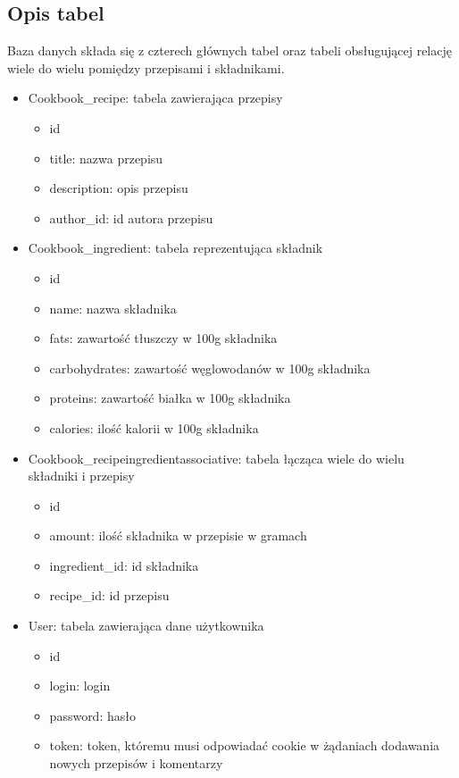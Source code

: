 \documentclass[11pt]{article}
\begin{document}
\subsection{Opis tabel}
Baza danych składa się z czterech głównych tabel oraz tabeli obsługującej relację
wiele do wielu pomiędzy przepisami i składnikami.
\begin{itemize}
    \item Cookbook\_recipe: tabela zawierająca przepisy
    \begin{itemize}
        \item id
        \item title: nazwa przepisu
        \item description: opis przepisu
        \item author\_id: id autora przepisu
    \end{itemize}
    \item Cookbook\_ingredient: tabela reprezentująca składnik
    \begin{itemize}
        \item id
        \item name: nazwa składnika
        \item fats: zawartość tłuszczy w 100g składnika
        \item carbohydrates: zawartość węglowodanów w 100g składnika
        \item proteins: zawartość białka w 100g składnika
        \item calories: ilość kalorii w 100g składnika
    \end{itemize}
    \item Cookbook\_recipeingredientassociative: tabela łącząca wiele do wielu składniki i przepisy
    \begin{itemize}
        \item id
        \item amount: ilość składnika w przepisie w gramach
        \item ingredient\_id: id składnika
        \item recipe\_id: id przepisu
    \end{itemize}
    \item User: tabela zawierająca dane użytkownika
    \begin{itemize}
        \item id
        \item login: login
        \item password: hasło
        \item token: token, któremu musi odpowiadać cookie w żądaniach dodawania nowych przepisów i komentarzy

\end{itemize}
\end{itemize}
\end{document}
